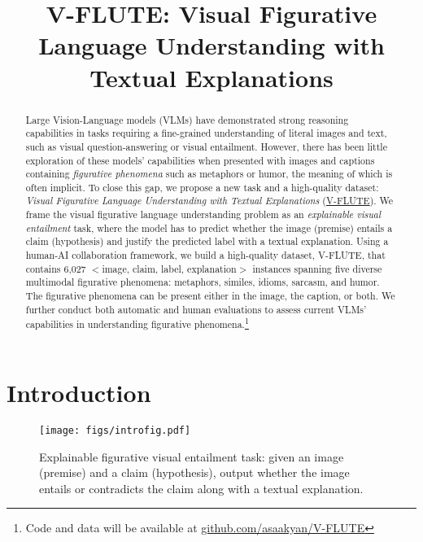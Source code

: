 
\title{V-FLUTE: Visual Figurative Language Understanding with Textual Explanations}
\maketitle

\begin{abstract}
  Large Vision-Language models (VLMs) have demonstrated strong reasoning capabilities in tasks requiring a fine-grained understanding of literal images and text, such as visual question-answering or visual entailment. However, there has been little exploration of these models' capabilities when presented with images and captions containing \textit{figurative phenomena} such as metaphors or humor, the meaning of which is often implicit. To close this gap, we propose a new task and a high-quality dataset: \textit{Visual Figurative Language Understanding with Textual Explanations} (\underline{V-FLUTE}). We frame the visual figurative language understanding problem as an \textit{explainable visual entailment} task, where the model has to predict whether the image (premise) entails a claim (hypothesis) and justify the predicted label with a textual explanation. Using a human-AI collaboration framework, we build a high-quality dataset, V-FLUTE, that contains 6,027 $<$image, claim, label, explanation$>$ instances spanning five diverse multimodal figurative phenomena: metaphors, similes, idioms, sarcasm, and humor.  The figurative phenomena can be present either in the image, the caption, or both. We further conduct both automatic and human evaluations to assess current VLMs' capabilities in understanding figurative phenomena.\footnote{Code and data will be available at \href{https://github.com/asaakyan/V-FLUTE}{github.com/asaakyan/V-FLUTE}}

\end{abstract}

\section{Introduction}

\begin{figure}[!ht]
\centering
    \texttt{[image: figs/introfig.pdf]}
    \caption{    Explainable figurative visual entailment task: given an image (premise) and a claim (hypothesis), output whether the image entails or contradicts the claim along with a textual explanation.
    }
    \label{fig:introFig}
\end{figure}

